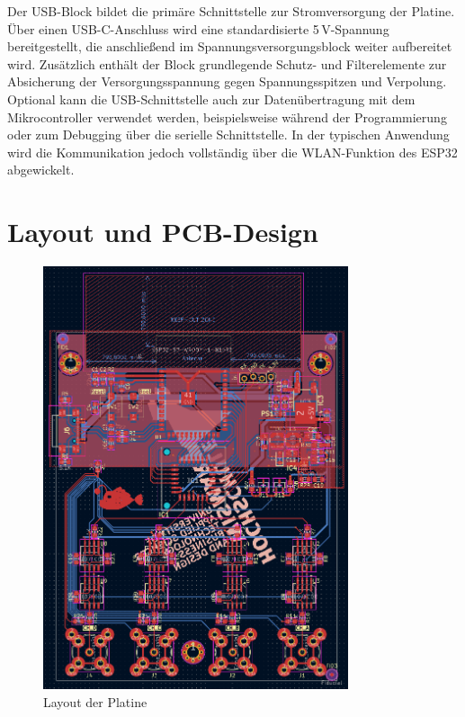 Der USB-Block bildet die primäre Schnittstelle zur Stromversorgung der Platine. Über einen USB-C-Anschluss wird eine standardisierte 5\,V-Spannung bereitgestellt, die anschließend im Spannungsversorgungsblock weiter aufbereitet wird. Zusätzlich enthält der Block grundlegende Schutz- und Filterelemente zur Absicherung der Versorgungsspannung gegen Spannungsspitzen und Verpolung.
Optional kann die USB-Schnittstelle auch zur Datenübertragung mit dem Mikrocontroller verwendet werden, beispielsweise während der Programmierung oder zum Debugging über die serielle Schnittstelle. In der typischen Anwendung wird die Kommunikation jedoch vollständig über die WLAN-Funktion des ESP32 abgewickelt.

\section{Layout und PCB-Design}

\begin{figure}[H]
    \centering
    \includegraphics[width=0.8\textwidth]{bilder/Platinen-Layout.png}
    \caption{Layout der Platine}
    \label{fig:usb_block}
\end{figure}

